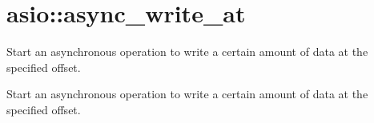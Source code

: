 \hypertarget{group__async__write__at}{}\section{asio\+:\+:async\+\_\+write\+\_\+at}
\label{group__async__write__at}


Start an asynchronous operation to write a certain amount of data at the specified offset.  


Start an asynchronous operation to write a certain amount of data at the specified offset. 

